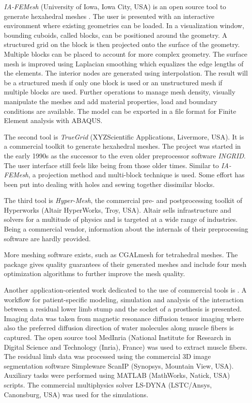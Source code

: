 \emph{IA-FEMesh} (University of Iowa, Iowa City, USA) is an open source tool to generate hexahedral meshes \cite{grosland2009ia}. The user is presented with an interactive environment where existing geometries can be loaded. In a visualization window, bounding cuboids, called blocks, can be positioned around the geometry. A structured grid on the block is then projected onto the surface of the geometry. Multiple blocks can be placed to account for more complex geometry. The surface mesh is improved using Laplacian smoothing which equalizes the edge lengths of the elements.
The interior nodes are generated using interpolation.
The result will be a structured mesh if only one block is used or an unstructured mesh if multiple blocks are used. Further operations to manage mesh density, visually manipulate the meshes and add material properties, load and boundary conditions are available. The model can be exported in a file format for Finite Element analysis with ABAQUS.

The second tool is \emph{TrueGrid} (XYZScientific Applications, Livermore, USA). It is a commercial toolkit to generate hexahedral meshes. The project was started in the early 1990s as the successor to the even older preprocessor software \emph{INGRID}. The user interface still feels like being from those older times. Similar to \emph{IA-FEMesh}, a projection method and multi-block technique is used. Some effort has been put into dealing with holes and sewing together dissimilar blocks.

The third tool is \emph{Hyper-Mesh}, the commercial pre- and postprocessing toolkit of Hyperworks (Altair HyperWorks, Troy, USA).
Altair sells infrastructure and solvers for a multitude of physics and is targeted at a wide range of industries. 
Being a commercial vendor, information about the internals of their preprocessing software are hardly provided.

More meshing software exists, such as CGALmesh \cite{Jamin2015CGALmesh} for tetrahedral meshes. The package gives quality guarantees of their generated meshes and include four mesh optimization algorithms to further improve the mesh quality.

Another application-oriented work dedicated to the use of commercial tools is \cite{Ellankavi2018}. A workflow for patient-specific modeling, simulation and analysis of the interaction between a residual lower limb stump and the socket of a prosthesis is presented. Imaging data was taken from magnetic resonance diffusion tensor imaging where also the preferred diffusion direction of water molecules along muscle fibers is captured. The open source tool MedInria (National Institute for Research in Digital Science and Technology (Inria), France) \cite{vichot2012cardiac} was used to extract muscle fibers. The residual limb data was processed using the commercial 3D image segmentation software Simpleware ScanIP (Synopsys, Mountain View, USA). Auxiliary tasks were performed using MATLAB (MathWorks,	Natick, USA) scripts. The commercial multiphysics solver LS-DYNA (LSTC/Ansys, Canonsburg, USA) was used for the simulations.

